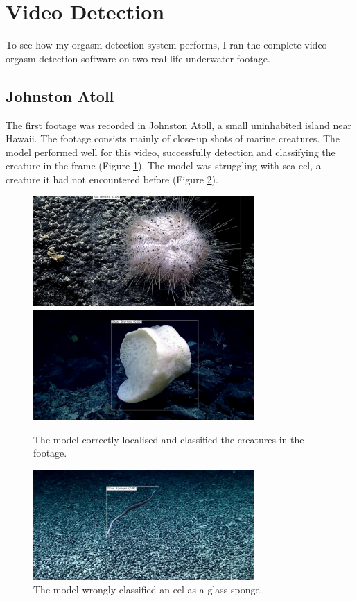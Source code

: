 \documentclass[12pt,a4paper,twoside,openany]{report}
\begin{document}
\section{Video Detection} \label{section:video}
To see how my orgasm detection system performs, I ran the complete video orgasm detection software on two real-life underwater footage.

\subsection{Johnston Atoll}
The first footage was recorded in Johnston Atoll, a small uninhabited island near Hawaii. The footage consists mainly of close-up shots of marine creatures. The model performed well for this video, successfully detection and classifying the creature in the frame (Figure \ref{fig:johnton_good}). The model was struggling with sea eel, a creature it had not encountered before (Figure \ref{fig:johnton_bad}).

\begin{figure}[H]
    \centering
    \includegraphics[width=0.75\textwidth]{figs/eval/video/johntson/urchin.png}
    \includegraphics[width=0.75\textwidth]{figs/eval/video/johntson/glass_sponge.png}
    \caption{The model correctly localised and classified the creatures in the footage.}
    \label{fig:johnton_good}
\end{figure}
\begin{figure}[H]
    \centering
    \includegraphics[width=0.75\textwidth]{figs/eval/video/johntson/snake.png}
    \caption{The model wrongly classified an eel as a glass sponge. }
    \label{fig:johnton_bad}
\end{figure}
\end{document}
